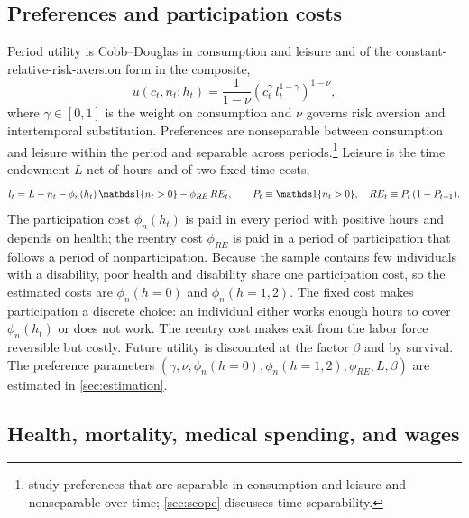 \subsection{Preferences and participation costs}\label{subsec:preferences}

Period utility is Cobb--Douglas in consumption and leisure and of the constant-relative-risk-aversion form in the composite,
\begin{equation}\label{eq:utility}
u(c_t,n_t;h_t)=\frac{1}{1-\nu}\left(c_t^{\gamma}\,l_t^{1-\gamma}\right)^{1-\nu},
\end{equation}
where $\gamma\in[0,1]$ is the weight on consumption and $\nu$ governs risk aversion and intertemporal substitution. %
Preferences are nonseparable between consumption and leisure within the period and separable across periods.\footnote{\citet{grochulski2010nonseparable} study preferences that are separable in consumption and leisure and nonseparable over time; \autoref{sec:scope} discusses time separability.} %
Leisure is the time endowment $L$ net of hours and of two fixed time costs,
\begin{equation}\label{eq:leisure}
l_t = L - n_t - \phi_n(h_t)\,\ind{n_t>0} - \phi_{RE}\,RE_t,
\qquad P_t\equiv\ind{n_t>0},\quad RE_t\equiv P_t\,(1-P_{t-1}).
\end{equation}
The participation cost $\phi_n(h_t)$ is paid in every period with positive hours and depends on health; the reentry cost $\phi_{RE}$ is paid in a period of participation that follows a period of nonparticipation. %
Because the sample contains few individuals with a disability, poor health and disability share one participation cost, so the estimated costs are $\phi_n(h=0)$ and $\phi_n(h=1,2)$. %
The fixed cost makes participation a discrete choice: an individual either works enough hours to cover $\phi_n(h_t)$ or does not work. The reentry cost makes exit from the labor force reversible but costly. Future utility is discounted at the factor $\beta$ and by survival. The preference parameters $(\gamma,\nu,\phi_n(h=0),\phi_n(h=1,2),\phi_{RE},L,\beta)$ are estimated in \autoref{sec:estimation}. %

\subsection{Health, mortality, medical spending, and wages}\label{subsec:shocks}


